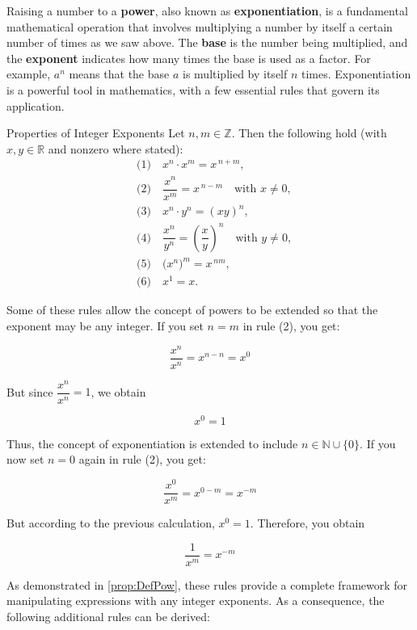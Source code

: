 Raising a number to a \textbf{power}, also known as \textbf{exponentiation}, is a fundamental mathematical operation that involves multiplying a number by itself a certain number of times as we saw above. The \textbf{base} is the number being multiplied, and the \textbf{exponent} indicates how many times the base is used as a factor. For example, \(a^n\) means that the base \(a\) is multiplied by itself \(n\) times. Exponentiation is a powerful tool in mathematics, with a few essential rules that govern its application.

\begin{proposition}{Properties of Integer Exponents}
\label{prop:DefPow}
Let $n,m\in\mathbb{Z}$. Then the following hold (with $x,y\in\mathbb{R}$ and nonzero where stated):
\[
\begin{aligned}
&\text{(1)}\quad x^{n}\cdot x^{m}=x^{\,n+m},\\[2pt]
&\text{(2)}\quad \dfrac{x^{n}}{x^{m}}=x^{\,n-m}\quad \text{with } x\neq 0,\\[2pt]
&\text{(3)}\quad x^{n}\cdot y^{n}=(xy)^{n},\\[2pt]
&\text{(4)}\quad \dfrac{x^{n}}{y^{n}}=\left(\dfrac{x}{y}\right)^{n}\quad \text{with } y\neq 0,\\[2pt]
&\text{(5)}\quad \bigl(x^{n}\bigr)^{m}=x^{\,nm},\\[2pt]
&\text{(6)}\quad x^{1}=x.
\end{aligned}
\]
\end{proposition}


Some of these rules allow the concept of powers to be extended so that the exponent may be any integer. If you set \(n = m\) in rule (2), you get:

\[
\frac{x^n}{x^n} = x^{n-n} = x^0
\]

But since \(\dfrac{x^n}{x^n} = 1\), we obtain

\[
x^0 = 1
\]

Thus, the concept of exponentiation is extended to include \(n \in \mathbb{N} \cup \{0\}\). If you now set \(n = 0\) again in rule (2), you get:

\[
\frac{x^0}{x^m} = x^{0-m} = x^{-m}
\]

But according to the previous calculation, \(x^0 = 1\). Therefore, you obtain

\begin{equation*}
 \frac{1}{x^m} = x^{-m}   
\end{equation*}

As demonstrated in \autoref{prop:DefPow}, these rules provide a complete framework for manipulating expressions with any integer exponents. As a consequence, the following additional rules can be derived:

